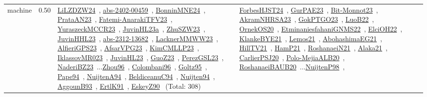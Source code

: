 {\begin{longtable}{p{3cm}r>{\raggedright\arraybackslash}p{6cm}>{\raggedright\arraybackslash}p{6cm}>{\raggedright\arraybackslash}p{8cm}}
\index{machine}\index{Scheduling!machine}machine &  0.50 & \href{../works/LiLZDZW24.pdf}{LiLZDZW24}~\cite{LiLZDZW24}, \href{../works/abs-2402-00459.pdf}{abs-2402-00459}~\cite{abs-2402-00459}, \href{../works/BonninMNE24.pdf}{BonninMNE24}~\cite{BonninMNE24}, \href{../works/PrataAN23.pdf}{PrataAN23}~\cite{PrataAN23}, \href{../works/Fatemi-AnarakiTFV23.pdf}{Fatemi-AnarakiTFV23}~\cite{Fatemi-AnarakiTFV23}, \href{../works/YuraszeckMCCR23.pdf}{YuraszeckMCCR23}~\cite{YuraszeckMCCR23}, \href{../works/JuvinHL23a.pdf}{JuvinHL23a}~\cite{JuvinHL23a}, \href{../works/ZhuSZW23.pdf}{ZhuSZW23}~\cite{ZhuSZW23}, \href{../works/JuvinHHL23.pdf}{JuvinHHL23}~\cite{JuvinHHL23}, \href{../works/abs-2312-13682.pdf}{abs-2312-13682}~\cite{abs-2312-13682}, \href{../works/LacknerMMWW23.pdf}{LacknerMMWW23}~\cite{LacknerMMWW23}, \href{../works/AlfieriGPS23.pdf}{AlfieriGPS23}~\cite{AlfieriGPS23}, \href{../works/AfsarVPG23.pdf}{AfsarVPG23}~\cite{AfsarVPG23}, \href{../works/KimCMLLP23.pdf}{KimCMLLP23}~\cite{KimCMLLP23}, \href{../works/IklassovMR023.pdf}{IklassovMR023}~\cite{IklassovMR023}, \href{../works/JuvinHL23.pdf}{JuvinHL23}~\cite{JuvinHL23}, \href{../works/GuoZ23.pdf}{GuoZ23}~\cite{GuoZ23}, \href{../works/PerezGSL23.pdf}{PerezGSL23}~\cite{PerezGSL23}, \href{../works/NaderiBZ23.pdf}{NaderiBZ23}~\cite{NaderiBZ23}...\href{../works/Zhou96.pdf}{Zhou96}~\cite{Zhou96}, \href{../works/Colombani96.pdf}{Colombani96}~\cite{Colombani96}, \href{../works/Goltz95.pdf}{Goltz95}~\cite{Goltz95}, \href{../works/Pape94.pdf}{Pape94}~\cite{Pape94}, \href{../works/NuijtenA94.pdf}{NuijtenA94}~\cite{NuijtenA94}, \href{../works/BeldiceanuC94.pdf}{BeldiceanuC94}~\cite{BeldiceanuC94}, \href{../works/Nuijten94.pdf}{Nuijten94}~\cite{Nuijten94}, \href{../works/AggounB93.pdf}{AggounB93}~\cite{AggounB93}, \href{../works/ErtlK91.pdf}{ErtlK91}~\cite{ErtlK91}, \href{../works/EskeyZ90.pdf}{EskeyZ90}~\cite{EskeyZ90} (Total: 308) & \href{../works/ForbesHJST24.pdf}{ForbesHJST24}~\cite{ForbesHJST24}, \href{../works/GurPAE23.pdf}{GurPAE23}~\cite{GurPAE23}, \href{../works/Bit-Monnot23.pdf}{Bit-Monnot23}~\cite{Bit-Monnot23}, \href{../works/AkramNHRSA23.pdf}{AkramNHRSA23}~\cite{AkramNHRSA23}, \href{../works/GokPTGO23.pdf}{GokPTGO23}~\cite{GokPTGO23}, \href{../works/LuoB22.pdf}{LuoB22}~\cite{LuoB22}, \href{../works/OrnekOS20.pdf}{OrnekOS20}~\cite{OrnekOS20}, \href{../works/EtminaniesfahaniGNMS22.pdf}{EtminaniesfahaniGNMS22}~\cite{EtminaniesfahaniGNMS22}, \href{../works/ElciOH22.pdf}{ElciOH22}~\cite{ElciOH22}, \href{../works/KlankeBYE21.pdf}{KlankeBYE21}~\cite{KlankeBYE21}, \href{../works/Lemos21.pdf}{Lemos21}~\cite{Lemos21}, \href{../works/AbohashimaEG21.pdf}{AbohashimaEG21}~\cite{AbohashimaEG21}, \href{../works/HillTV21.pdf}{HillTV21}~\cite{HillTV21}, \href{../works/HamP21.pdf}{HamP21}~\cite{HamP21}, \href{../works/RoshanaeiN21.pdf}{RoshanaeiN21}~\cite{RoshanaeiN21}, \href{../works/Alaka21.pdf}{Alaka21}~\cite{Alaka21}, \href{../works/CarlierPSJ20.pdf}{CarlierPSJ20}~\cite{CarlierPSJ20}, \href{../works/Polo-MejiaALB20.pdf}{Polo-MejiaALB20}~\cite{Polo-MejiaALB20}, \href{../works/RoshanaeiBAUB20.pdf}{RoshanaeiBAUB20}~\cite{RoshanaeiBAUB20}...\href{../works/NuijtenP98.pdf}{NuijtenP98}~\cite{NuijtenP98}, 
\end{longtable}}
